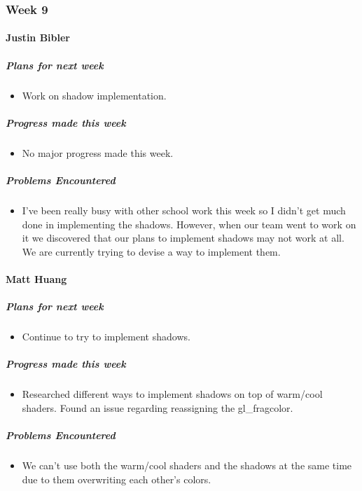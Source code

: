\newpage
{
\subsubsection{Week 9}
\paragraph{Justin Bibler}
\subparagraph{Plans for next week}
\begin{itemize}
  \item Work on shadow implementation.
\end{itemize}

\subparagraph{Progress made this week}
\begin{itemize}
  \item No major progress made this week.
\end{itemize}

\subparagraph{Problems Encountered}
\begin{itemize}
  \item I've been really busy with other school work this week so I didn't get much done in implementing the shadows. However, when our team went to work on it we discovered that our plans to implement shadows may not work at all. We are currently trying to devise a way to implement them.
\end{itemize}
\vspace{3mm}

\paragraph{Matt Huang}
\subparagraph{Plans for next week}
\begin{itemize}
  \item Continue to try to implement shadows.
\end{itemize}

\subparagraph{Progress made this week}
\begin{itemize}
  \item Researched different ways to implement shadows on top of warm/cool shaders. Found an issue regarding reassigning the gl_fragcolor.
\end{itemize}

\subparagraph{Problems Encountered}
\begin{itemize}
  \item We can't use both the warm/cool shaders and the shadows at the same time due to them overwriting each other's colors.
\end{itemize}
\vspace{3mm}

}
